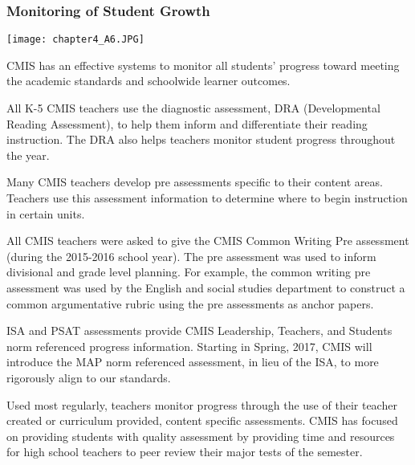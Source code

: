 \subsubsection{Monitoring of Student Growth}

{\centering\texttt{[image: chapter4\_A6.JPG]}}



\begin{findings}
CMIS has an effective systems to monitor all students’ progress toward meeting the academic standards and schoolwide learner outcomes.

 
All K-5 CMIS teachers use the diagnostic assessment, DRA (Developmental Reading Assessment), to help them inform and differentiate their reading instruction. The DRA also helps teachers monitor student progress throughout the year. 

Many CMIS teachers develop pre assessments specific to their content areas. Teachers use this assessment information to determine where to begin instruction in certain units. 

All CMIS teachers were asked to give the CMIS Common Writing Pre assessment (during the 2015-2016 school year). The pre assessment was used to inform divisional and grade level planning. For example, the common writing pre assessment was used by the English and social studies department to construct a common argumentative rubric using the pre assessments as anchor papers.

ISA and PSAT assessments provide CMIS Leadership, Teachers, and Students norm referenced progress information. Starting in Spring, 2017, CMIS will introduce the MAP norm referenced assessment, in lieu of the ISA, to more rigorously align to our standards. 

Used most regularly, teachers monitor progress through the use of their teacher created or curriculum provided, content specific assessments. CMIS has focused on providing students with quality assessment by providing time and resources for high school teachers to peer review their major tests of the semester. 


\end{findings}
